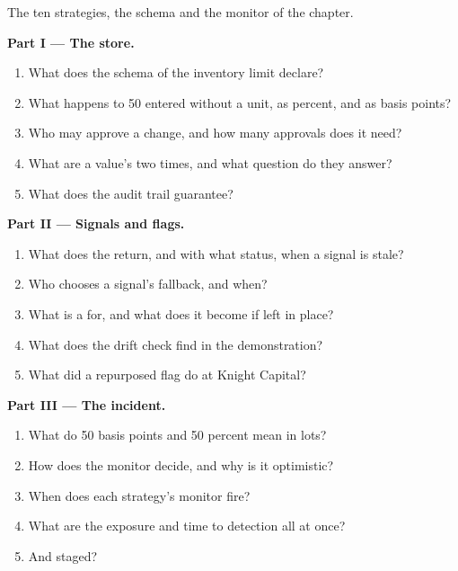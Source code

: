 \begin{problem}\label{pb:pl:signal-serving-and-parameter-management:1}
The ten strategies, the schema and the monitor of the chapter.

\medskip\noindent\textbf{Part I --- The store.}
\begin{enumerate}
\item What does the schema of the inventory limit declare?
\item What happens to 50 entered without a unit, as percent, and as basis points?
\item Who may approve a change, and how many approvals does it need?
\item What are a value's two times, and what question do they answer?
\item What does the audit trail guarantee?
\end{enumerate}

\medskip\noindent\textbf{Part II --- Signals and flags.}
\begin{enumerate}[resume]
\item What does the  return, and with what status, when a signal is stale?
\item Who chooses a signal's fallback, and when?
\item What is a  for, and what does it become if left in place?
\item What does the drift check find in the demonstration?
\item What did a repurposed flag do at Knight Capital?
\end{enumerate}

\medskip\noindent\textbf{Part III --- The incident.}
\begin{enumerate}[resume]
\item What do 50 basis points and 50 percent mean in lots?
\item How does the monitor decide, and why is it optimistic?
\item When does each strategy's monitor fire?
\item What are the exposure and time to detection all at once?
\item And staged?
\end{enumerate}


\end{problem}
